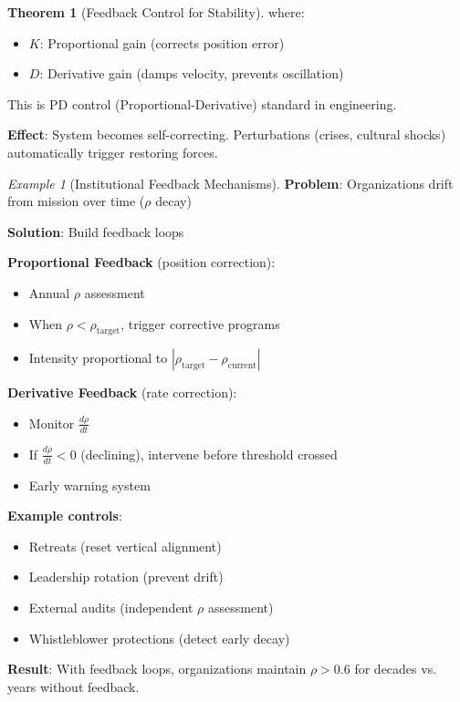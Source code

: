 \documentclass[11pt,a4paper]{article}
\theoremstyle{definition}
\newtheorem{theorem}{Theorem}[section]
\theoremstyle{remark}
\newtheorem{example}{Example}[section]
\begin{document}
\begin{small}
\begin{enumerate}
\begin{theorem}[Feedback Control for Stability]
where:
\begin{itemize}
    \item \(K\): Proportional gain (corrects position error)
    \item \(D\): Derivative gain (damps velocity, prevents oscillation)
\end{itemize}

This is PD control (Proportional-Derivative) standard in engineering.

\textbf{Effect}: System becomes self-correcting. Perturbations (crises, cultural shocks) automatically trigger restoring forces.
\end{theorem}

\begin{example}[Institutional Feedback Mechanisms]
\textbf{Problem}: Organizations drift from mission over time (\(\rho\) decay)

\textbf{Solution}: Build feedback loops

\textbf{Proportional Feedback} (position correction):
\begin{itemize}
    \item Annual \(\rho\) assessment
    \item When \(\rho < \rho_{\text{target}}\), trigger corrective programs
    \item Intensity proportional to \(|\rho_{\text{target}} - \rho_{\text{current}}|\)
\end{itemize}

\textbf{Derivative Feedback} (rate correction):
\begin{itemize}
    \item Monitor \(\frac{d\rho}{dt}\)
    \item If \(\frac{d\rho}{dt} < 0\) (declining), intervene before threshold crossed
    \item Early warning system
\end{itemize}

\textbf{Example controls}:
\begin{itemize}
    \item Retreats (reset vertical alignment)
    \item Leadership rotation (prevent drift)
    \item External audits (independent \(\rho\) assessment)
    \item Whistleblower protections (detect early decay)
\end{itemize}

\textbf{Result}: With feedback loops, organizations maintain \(\rho > 0.6\) for decades vs. years without feedback.
\end{example}


\end{enumerate}
\end{small}
\end{document}
